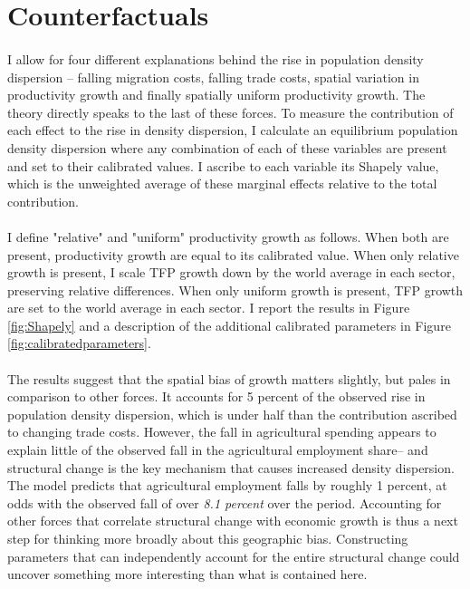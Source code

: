 \documentclass[]{article}
\theoremstyle{plain}
\begin{document}
\section{Counterfactuals}\label{section:results}
\paragraph*{}
I allow for four different explanations behind the rise in population density dispersion -- falling migration costs, falling trade costs, spatial variation in productivity growth and finally spatially uniform productivity growth. The theory directly speaks to the last of these forces. To measure the contribution of each effect to the rise in density dispersion, I calculate an equilibrium population density dispersion where any combination of each of these variables are present and set to their calibrated values. I ascribe to each variable its Shapely value, which is the unweighted average of these marginal effects relative to the total contribution.
\paragraph*{}
 I define "relative" and "uniform" productivity growth as follows. When both are present, productivity growth are equal to its calibrated value. When only relative growth is present, I scale TFP growth down by the world average in each sector, preserving relative differences. When only uniform growth is present, TFP growth are set to the world average in each sector. I report the results in Figure \ref{fig:Shapely} and a description of the additional  calibrated parameters in Figure \ref{fig:calibratedparameters}.  

\paragraph*{}
The results suggest that the spatial bias of growth matters slightly, but pales in comparison to other forces. It accounts for 5 percent of the observed rise in population density dispersion, which is under half than the contribution ascribed to changing trade costs. However, the fall in agricultural spending appears to explain little of the observed fall in the agricultural employment share-- and structural change is the key mechanism that causes increased density dispersion. The model predicts that agricultural employment falls by roughly 1 percent, at odds with the observed fall of over \textit{8.1 percent} over the period. Accounting for other forces that correlate structural change with economic growth is thus a next step for thinking more broadly about this geographic bias. Constructing parameters that can independently account for the entire structural change could uncover something more interesting than what is contained here. 
\end{document}
